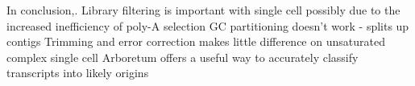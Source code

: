 

In conclusion,.
Library filtering is important with single cell possibly due to the increased inefficiency of poly-A selection
GC partitioning doesn't work - splits up contigs
Trimming and error correction makes little difference on unsaturated complex single cell 
Arboretum offers a useful way to accurately classify transcripts into likely origins 






